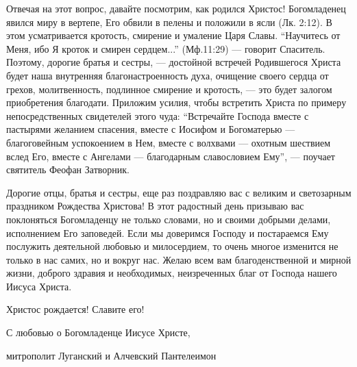 Отвечая на этот вопрос, давайте посмотрим, как родился Христос! Богомладенец
явился миру в вертепе, Его обвили в пелены и положили в ясли (Лк. 2:12). В этом
усматривается кротость, смирение и умаление Царя Славы. \enquote{Научитесь от Меня, ибо
Я кроток и смирен сердцем...} (Мф.11:29) — говорит Спаситель. Поэтому, дорогие
братья и сестры, — достойной встречей Родившегося Христа будет наша внутренняя
благонастроенность духа, очищение своего сердца от грехов, молитвенность,
подлинное смирение и кротость, — это будет залогом приобретения благодати.
Приложим усилия, чтобы встретить Христа по примеру непосредственных свидетелей
этого чуда: \enquote{Встречайте Господа вместе с пастырями желанием спасения, вместе с
Иосифом и Богоматерью — благоговейным успокоением в Нем, вместе с волхвами —
охотным шествием вслед Его, вместе с Ангелами — благодарным славословием Ему},
— поучает святитель Феофан Затворник.

Дорогие отцы, братья и сестры, еще раз поздравляю вас с великим и светозарным
праздником Рождества Христова! В этот радостный день призываю вас поклоняться
Богомладенцу не только словами, но и своими добрыми делами, исполнением Его
заповедей. Если мы доверимся Господу и постараемся Ему послужить деятельной
любовью и милосердием, то очень многое изменится не только в нас самих, но и
вокруг нас. Желаю всем вам благоденственной и мирной жизни, доброго здравия и
необходимых, неизреченных благ от Господа нашего Иисуса Христа.

Христос рождается! Славите его!

С любовью о Богомладенце Иисусе Христе,

митрополит Луганский и Алчевский Пантелеимон

